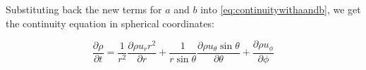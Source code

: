 \documentclass[12pt, letterpaper, twoside]{article}
\begin{document}
    Substituting back the new terms for \(\boxed{a}\) and \(\boxed{b}\) into \ref{eq:continuitywithaandb}, we get the continuity equation in spherical coordinates:

    \begin{equation}
        \boxed{\frac{\partial \rho}{\partial t}  =
        \frac{1}{r^2}  \frac{\partial \rho u_r r^2}{\partial r} +
        \frac{1}{r\sin\theta} \frac{\partial\rho u_{\theta} \sin\theta}{\partial\theta} 
        + \frac{\partial \rho u_{\phi}}{\partial \phi} }
    \end{equation}
\end{document}
